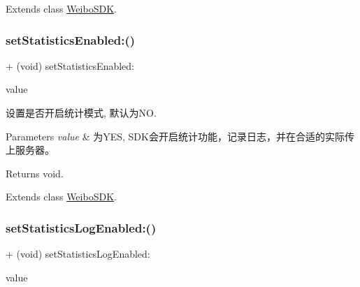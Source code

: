 Extends class \mbox{\hyperlink{interface_weibo_s_d_k_a0b32ee3e2b30059b93e7dea204b43818}{Weibo\+S\+DK}}.

\mbox{\label{category_weibo_s_d_k_07_statistics_08_a0b32ee3e2b30059b93e7dea204b43818}} 
\subsubsection{\texorpdfstring{set\+Statistics\+Enabled\+:()}{setStatisticsEnabled:()}\hspace{0.1cm}{\footnotesize\ttfamily [3/3]}}
{\footnotesize\ttfamily + (void) set\+Statistics\+Enabled\+: \begin{DoxyParamCaption}\item[{(B\+O\+OL)}]{value }\end{DoxyParamCaption}}

设置是否开启统计模式, 默认为\+NO. 
\begin{DoxyParams}{Parameters}
{\em value} & 为\+Y\+ES, S\+D\+K会开启统计功能，记录日志，并在合适的实际传上服务器。 \\
\hline
\end{DoxyParams}
\begin{DoxyReturn}{Returns}
void. 
\end{DoxyReturn}


Extends class \mbox{\hyperlink{interface_weibo_s_d_k_a0b32ee3e2b30059b93e7dea204b43818}{Weibo\+S\+DK}}.

\mbox{\label{category_weibo_s_d_k_07_statistics_08_a2e009db32a6d059ff53e35ac211d57f9}} 
\subsubsection{\texorpdfstring{set\+Statistics\+Log\+Enabled\+:()}{setStatisticsLogEnabled:()}\hspace{0.1cm}{\footnotesize\ttfamily [1/3]}}
{\footnotesize\ttfamily + (void) set\+Statistics\+Log\+Enabled\+: \begin{DoxyParamCaption}\item[{(B\+O\+OL)}]{value }\end{DoxyParamCaption}}

